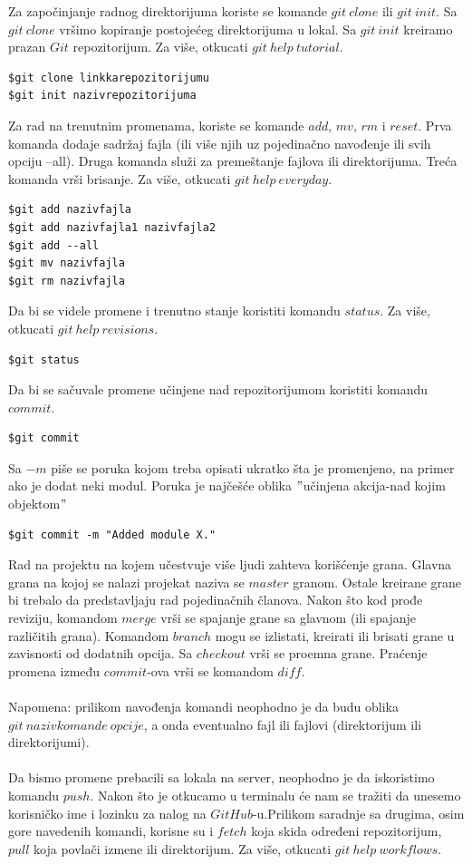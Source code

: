 Za započinjanje radnog direktorijuma koriste se komande $git\ clone$ ili $git\ init$. Sa $git\ clone$ vršimo kopiranje postojećeg direktorijuma u lokal. Sa $git\ init$ kreiramo prazan $Git$ repozitorijum. Za više, otkucati $git\ help\ tutorial$.

\begin{verbatim}
$git clone linkkarepozitorijumu
$git init nazivrepozitorijuma
\end{verbatim}

Za rad na trenutnim promenama, koriste se komande $add$, $mv$, $rm$ i $reset$. Prva komanda dodaje sadržaj fajla (ili više njih uz pojedinačno navođenje ili svih opciju --all). Druga komanda služi za premeštanje fajlova ili direktorijuma. Treća komanda vrši brisanje. Za više, otkucati $git\ help\ everyday$. 
\begin{verbatim}
$git add nazivfajla
$git add nazivfajla1 nazivfajla2
$git add --all
$git mv nazivfajla
$git rm nazivfajla
\end{verbatim}


Da bi se videle promene i trenutno stanje koristiti komandu $status$. Za više, otkucati $git\ help\ revisions$.
\begin{verbatim}
$git status
\end{verbatim}

Da bi se sačuvale promene učinjene nad repozitorijumom koristiti komandu $commit$. 
\begin{verbatim}
$git commit 
\end{verbatim}
Sa $-m$ piše se poruka kojom treba opisati ukratko šta je promenjeno, na primer ako je dodat neki modul. Poruka je najčešće oblika $"$učinjena akcija-nad kojim objektom$"$
\begin{verbatim}
$git commit -m "Added module X."
\end{verbatim}

Rad na projektu na kojem učestvuje više ljudi zahteva korišćenje grana. Glavna grana na kojoj se nalazi projekat naziva se $master$ granom. Ostale kreirane grane bi trebalo da predstavljaju rad pojedinačnih članova. Nakon što kod prođe reviziju, komandom $merge$ vrši se spajanje grane sa glavnom (ili spajanje različitih grana). Komandom $branch$ mogu se izlistati, kreirati ili brisati grane u zavisnosti od dodatnih opcija. Sa $checkout$ vrši se proemna grane. Praćenje promena između $commit$-ova vrši se komandom $diff$. \\\\
Napomena: prilikom navođenja komandi neophodno je da budu oblika $git\ nazivkomande\ opcije$, a onda eventualno fajl ili fajlovi (direktorijum ili direktorijumi).\\\\
Da bismo promene prebacili sa lokala na server, neophodno je da iskoristimo komandu $push$. Nakon što je otkucamo u terminalu će nam se tražiti da unesemo korisničko ime i lozinku za nalog na $GitHub$-u.Prilikom saradnje sa drugima, osim gore navedenih komandi, korisne su i $fetch$ koja skida određeni repozitorijum, $pull$ koja povlači izmene ili direktorijum. Za više, otkucati $git\ help\ workflows$. 

